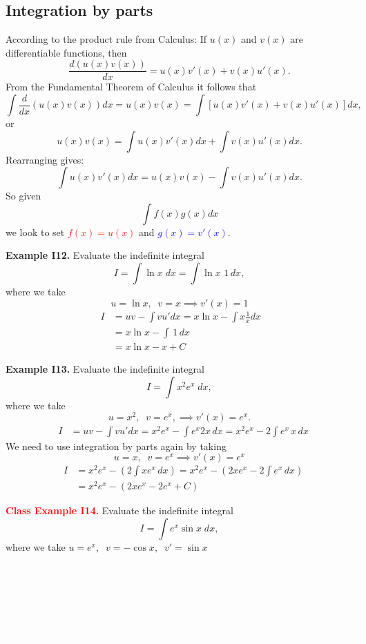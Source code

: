 \documentclass{article}
\begin{document}
\subsection{Integration by parts}

According to the product rule from Calculus: If $u(x)$ and $v(x)$ are
differentiable functions, then
{\small 
$$
\frac{d (u(x)v(x))}{dx}=u(x) v'(x)+v(x) u'(x).
$$
}
From the Fundamental Theorem of Calculus it follows that
$$
\int \frac{d}{dx} \left( u(x)v(x) \right) dx = u(x)v(x)= \int \left[u(x) v'(x)+v(x) u'(x)\right] dx,
$$
or
{\small 
$$
u(x)v(x)=  \int u(x) v'(x) dx + \int  v(x) u'(x) dx.
$$
}
Rearranging gives:
$$
\int u(x) v'(x) dx= u(x)v(x) - \int  v(x) u'(x) dx.
$$
So given
$$
\int f(x) g(x) dx
$$
we look to set \textcolor{red}{$f(x) = u(x)$} and \textcolor{blue}{$g(x) = v'(x)$}.



\textbf{Example I12.} Evaluate  the indefinite integral
$$
I=\int \ln x \; dx = \int \ln x \,\, 1 \,dx,
$$
where we take
$$
u=\ln x, \;\; v=x \implies v'(x) = 1
$$
\begin{eqnarray}
& I & = uv - \int  v u' dx = x \ln x - \int x \frac{1}{x} dx  \; \;  \nonumber\\
&   & =  x \ln x - \int  \,1 \, d x \; \; \nonumber\\
&   & =  x \ln x - x +C \; \; \nonumber
  \nonumber
\end{eqnarray}


\textbf{Example I13.} Evaluate the indefinite integral
$$
I=\int x^2 e^x \; dx,
$$
where we take
$$
u=x^2, \;\; v=e^x, \implies v'(x)= e^x.
$$
\begin{eqnarray}
& I & = uv - \int  v u' dx = x^2 e^x - \int e^x  2x \, dx  =   x^2 e^x - 2 \int e^x \, x \, d x  \nonumber
\end{eqnarray}
We need to use integration by parts again by taking
$$
u=x, \;\; v=e^x \implies v'(x) = e^x
$$
\begin{eqnarray}
& I & = x^2 e^x -  \left( 2 \int x  e^x \, dx \right)  =   x^2 e^x - \left( 2 x e^x - 2 \int e^x \,d x \right)
\nonumber\\
 &   & =   x^2 e^x - \left( 2 x e^x - 2 e^x  +C
\right) \nonumber
\end{eqnarray}


\textcolor{red}{\textbf{Class Example I14.}} Evaluate  the indefinite integral
$$
I=\int e^x  \sin x \;   dx,
$$
where we take $u=e^x, \;\; v=-\cos x, \;\;  v'=\sin x $
\textcolor{white}{
\begin{eqnarray}
& I & = uv - \int  v \, u' dx = - e^x \cos x  + \int \cos x e^x  d x  \; \;  \nonumber\\
&   & = - e^x \cos x  + \left( \int e^x (\sin x)' dx  \right)
\nonumber\\
&   & = - e^x \cos x  + \left( \sin x  e^x -  \int  \sin  x e^x\, dx
\right) \nonumber \\
&& = - e^x \cos x  + \sin x  e^x - I \nonumber
\nonumber
\end{eqnarray}
Solving for $I$:
\begin{eqnarray}
& I & =  (- e^x \cos x  +  \sin x  e^x)/2 + C \nonumber
\end{eqnarray}
}
\end{document}
